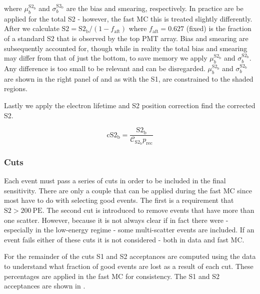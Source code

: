 \noindent where $\mu_{b}^{\mathrm{S2_b}}$ and $\sigma_{b}^{\mathrm{S2_b}}$ are the \stwob bias and smearing,
respectively.  In practice  are be applied
for the total S2 - however, the fast MC this is treated
slightly differently.  After  we calculate
$\mathrm{S2} = \mathrm{S2_b} / (1 - f_{\mathrm{aft}})$ where $f_{\mathrm{aft}} = 0.627$ (fixed) is the fraction of a standard S2 that
is observed by the top PMT array.  Bias and smearing are subsequently accounted for, though while in reality the total bias and smearing
may differ from that of just the bottom, to save memory we apply $\mu_{b}^{\mathrm{S2_b}}$ and $\sigma_{b}^{\mathrm{S2_b}}$.  Any
difference is too small to be relevant and can be disregarded.  $\mu_{b}^{\mathrm{S2_b}}$ and $\sigma_{b}^{\mathrm{S2_b}}$ are shown in
the right panel of  and as with the S1, are constrained to the
shaded regions.

Lastly we apply the electron lifetime and S2 position correction find the corrected S2.

\begin{equation}
\mathrm{cS2_b} = \frac{\mathrm{S2_b}}{\mathcal{C}_{\mathrm{S2_b}} p_{\mathrm{rec}}}
\end{equation}



\subsubsection{Cuts}
\label{subsubsec:er_nr_calibrations_parameter_determ_cuts}
Each event must pass a series of cuts in order to be included in the final sensitivity.  There are only a couple that can be applied
during the fast MC since most have to do with selecting good events.  The first is a requirement that
$\mathrm{S2} > 200\ \mathrm{PE}$.  The second cut is introduced to remove events that have more than one scatter.  However, because it is
not always clear if in fact there were - especially in the low-energy regime - some multi-scatter events are included.  If an event
fails either of these cuts it is not considered - both in data and fast MC.

For the remainder of the cuts S1 and S2 acceptances are computed using the data to understand what fraction of good events are lost
as a result of each cut.  These percentages are applied in the fast MC for consistency.  The S1 and S2 acceptances are shown in
.

